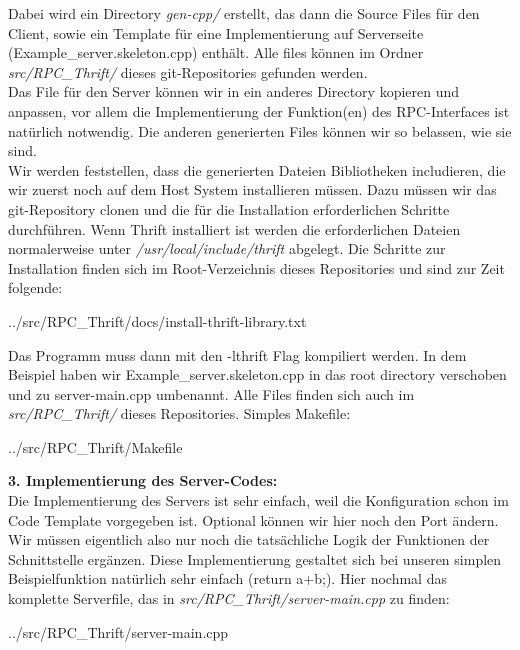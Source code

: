 Dabei wird ein Directory \textit{gen-cpp/} erstellt, das dann die Source Files für den Client, sowie ein Template für eine Implementierung auf Serverseite (Example\_server.skeleton.cpp) enthält. Alle files können im Ordner \textit{src/RPC\_Thrift/} dieses git-Repositories gefunden werden.\\
Das File für den Server können wir in ein anderes Directory kopieren und anpassen, vor allem die Implementierung der Funktion(en) des RPC-Interfaces ist natürlich notwendig. Die anderen generierten Files können wir so belassen, wie sie sind.\\
Wir werden feststellen, dass die generierten Dateien Bibliotheken includieren, die wir zuerst noch auf dem Host System installieren müssen. Dazu müssen wir das git-Repository clonen und die für die Installation erforderlichen Schritte durchführen. Wenn Thrift installiert ist werden die erforderlichen Dateien normalerweise unter \textit{/usr/local/include/thrift} abgelegt. Die Schritte zur Installation finden sich im Root-Verzeichnis dieses Repositories und sind zur Zeit folgende:

\begin{lstinputlisting}[]
    {../src/RPC_Thrift/docs/install-thrift-library.txt}
\end{lstinputlisting}

Das Programm muss dann mit den -lthrift Flag kompiliert werden. In dem Beispiel haben wir Example\_server.skeleton.cpp in das root directory verschoben und zu server-main.cpp umbenannt. Alle Files finden sich auch im \textit{src/RPC\_Thrift/} dieses Repositories. Simples Makefile:

\begin{lstinputlisting}[]
    {../src/RPC_Thrift/Makefile}
\end{lstinputlisting}

\textbf{3. Implementierung des Server-Codes:}\\
Die Implementierung des Servers ist sehr einfach, weil die Konfiguration schon im Code Template vorgegeben ist. Optional können wir hier noch den Port ändern. Wir müssen eigentlich also nur noch die tatsächliche Logik der Funktionen der Schnittstelle ergänzen. Diese Implementierung gestaltet sich bei unseren simplen Beispielfunktion natürlich sehr einfach (return a+b;). Hier nochmal das komplette Serverfile, das in \textit{src/RPC\_Thrift/server-main.cpp} zu finden:

\begin{lstinputlisting}[]
    {../src/RPC_Thrift/server-main.cpp}
\end{lstinputlisting}

